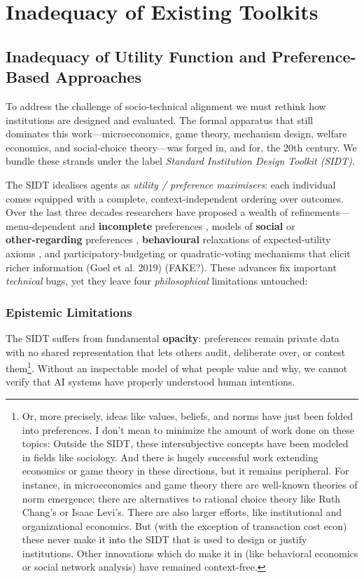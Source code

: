 \section{Inadequacy of Existing Toolkits}

\subsection{Inadequacy of Utility Function and Preference-Based Approaches}

To address the challenge of socio‑technical alignment we must rethink how institutions are designed and evaluated. The formal apparatus that still dominates this work—microeconomics, game theory, mechanism design, welfare economics, and social‑choice theory—was forged in, and for, the 20th century. We bundle these strands under the label \textit{Standard Institution Design Toolkit (SIDT)}.

The SIDT idealises agents as \textit{utility / preference maximisers}: each individual comes equipped with a complete, context‑independent ordering over outcomes. Over the last three decades researchers have proposed a wealth of refinements—menu‑dependent and \textbf{incomplete} preferences \cite{gul2001, bewley2002}, models of \textbf{social} or \textbf{other‑regarding} preferences \cite{fehr1999}, \textbf{behavioural} relaxations of expected‑utility axioms \cite{tversky1992}, and participatory-budgeting or quadratic-voting mechanisms that elicit richer information (Goel et al. 2019) (FAKE?). These advances fix important \textit{technical} bugs, yet they leave four \textit{philosophical} limitations untouched:

\subsubsection{Epistemic Limitations}

The SIDT suffers from fundamental \textbf{opacity}: preferences remain private data with no shared representation that lets others audit, deliberate over, or contest them\footnote{Or, more precisely, ideas like values, beliefs, and norms have just been folded into preferences. I don't mean to minimize the amount of work done on these topics: Outside the SIDT, these intersubjective concepts have been modeled in fields like sociology. And there is hugely successful work extending economics or game theory in these directions, but it remains peripheral. For instance, in microeconomics and game theory there are well-known theories of norm emergence; there are alternatives to rational choice theory like Ruth Chang's or Isaac Levi's. There are also larger efforts, like institutional and organizational economics. But (with the exception of transaction cost econ) these never make it into the SIDT that is used to design or justify institutions. Other innovations which do make it in (like behavioral economics or social network analysis) have remained context-free.}. Without an inspectable model of what people value and why, we cannot verify that AI systems have properly understood human intentions.


